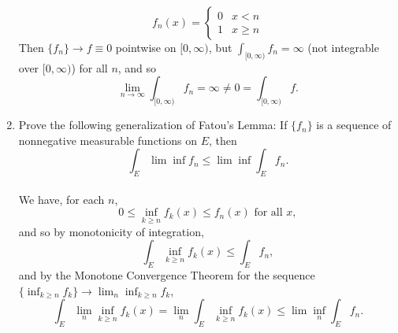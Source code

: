 \begin{enumerate}
    \[
        f_n(x)=
        \begin{cases}
            0&x<n\\
            1&x\ge n
        \end{cases}
    \]
    Then $\{f_n\}\to f\equiv0$ pointwise on $[0,\infty)$, but $\int_{[0,\infty)}f_n=\infty$ (not integrable over $[0,\infty)$) for all $n$, and so
    \[
        \lim_{n\to\infty}\int_{[0,\infty)}f_n=\infty\neq0=\int_{[0,\infty)}f.
    \]
    \item Prove the following generalization of Fatou's Lemma: If $\{f_n\}$ is a sequence of nonnegative measurable functions on $E$, then 
    \[
        \int_E\lim\inf f_n\le\lim\inf\int_Ef_n.     
    \]
    \\We have, for each $n$,
    \[
        0\le\inf_{k\ge n} f_k(x)\le f_n(x)\text{ for all }x,
    \]
    and so by monotonicity of integration,
    \[
    \int_E\inf_{k\ge n} f_k(x)\le\int_Ef_n,
    \]
    and by the Monotone Convergence Theorem for the sequence $\{\inf_{k\ge n} f_k\}\to\lim_n\inf_{k\ge n} f_k$,
    \[
    \int_E\lim_n\inf_{k\ge n} f_k(x)=\lim_n\int_E\inf_{k\ge n} f_k(x)\le\lim\inf_n\int_Ef_n.
    \]
\end{enumerate}
    
